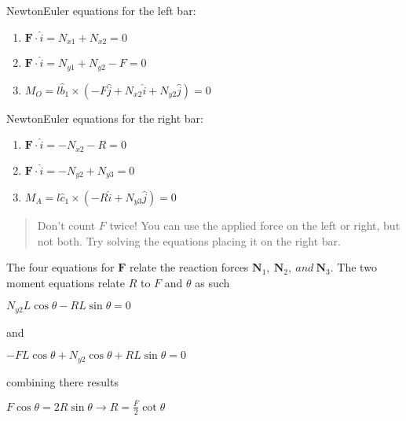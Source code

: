\documentclass[letterpaper,10pt,english]{sphinxmanual}
\begin{document}
Newton\sphinxhyphen{}Euler equations for the left bar:
\begin{enumerate}
%
\item {} 
\(\mathbf{F}\cdot \hat{i} = N_{x1}+N_{x2} = 0\)

\item {} 
\(\mathbf{F}\cdot \hat{i} = N_{y1}+N_{y2} - F = 0\)

\item {} 
\(M_O = l\hat{b}_1 \times (-F\hat{j} + N_{x2}\hat{i} + N_{y2}\hat{j})
= 0\)

\end{enumerate}

Newton\sphinxhyphen{}Euler equations for the right bar:
\begin{enumerate}
%
\item {} 
\(\mathbf{F}\cdot \hat{i} = -N_{x2}-R = 0\)

\item {} 
\(\mathbf{F}\cdot \hat{i} = -N_{y2}+N_{y3} = 0\)

\item {} 
\(M_A = l\hat{c}_1 \times (-R\hat{i} + N_{y3}\hat{j})= 0\)

\end{enumerate}
\begin{quote}

 Don’t count \(F\) twice! You can use the applied force on the
left or right, but not both. Try solving the equations placing it on
the right bar.
\end{quote}

The four equations for \(\mathbf{F}\) relate the reaction forces
\(\mathbf{N}_{1},~\mathbf{N}_{2},~and~\mathbf{N}_{3}\). The two moment
equations relate \(R\) to \(F\) and \(\theta\) as such

\(N_{y2}L\cos\theta - RL\sin\theta = 0\)

and

\(-FL\cos\theta +N_{y2}\cos\theta+RL\sin\theta = 0\)

combining there results

\(F\cos\theta = 2R\sin\theta\rightarrow R = \frac{F}{2}\cot\theta\)
\end{document}
